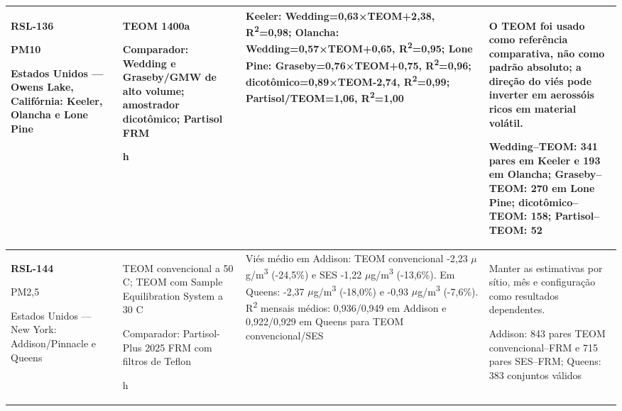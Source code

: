 \begin{longtable}{|P{0.18\textwidth}|P{0.25\textwidth}|P{0.28\textwidth}|P{\arrayrulewidth\relax}|}
\textbf{RSL-136}\par\textcite{rsl136}\par PM10\par Estados Unidos --- Owens Lake, Califórnia: Keeler, Olancha e Lone Pine & TEOM 1400a\par\medskip Comparador: Wedding e Graseby/GMW de alto volume; amostrador dicotômico; Partisol FRM\par{} h & Keeler: Wedding=0,63×TEOM+2,38, R\textsuperscript{2}=0,98; Olancha: Wedding=0,57×TEOM+0,65, R\textsuperscript{2}=0,95; Lone Pine: Graseby=0,76×TEOM+0,75, R\textsuperscript{2}=0,96; dicotômico=0,89×TEOM-2,74, R\textsuperscript{2}=0,99; Partisol/TEOM=1,06, R\textsuperscript{2}=1,00 & O TEOM foi usado como referência comparativa, não como padrão absoluto; a direção do viés pode inverter em aerossóis ricos em material volátil.\par\medskip Wedding--TEOM: 341 pares em Keeler e 193 em Olancha; Graseby--TEOM: 270 em Lone Pine; dicotômico--TEOM: 158; Partisol--TEOM: 52\\\hline
\textbf{RSL-144}\par\textcite{rsl144}\par PM2,5\par Estados Unidos --- New York: Addison/Pinnacle e Queens & TEOM convencional a 50 \textdegree{}C; TEOM com Sample Equilibration System a 30 \textdegree{}C\par\medskip Comparador: Partisol-Plus 2025 FRM com filtros de Teflon\par{} h & Viés médio em Addison: TEOM convencional -2,23 \ensuremath{\mu}g/m\textsuperscript{3} (-24,5\%) e SES -1,22 \ensuremath{\mu}g/m\textsuperscript{3} (-13,6\%). Em Queens: -2,37 \ensuremath{\mu}g/m\textsuperscript{3} (-18,0\%) e -0,93 \ensuremath{\mu}g/m\textsuperscript{3} (-7,6\%). R\textsuperscript{2} mensais médios: 0,936/0,949 em Addison e 0,922/0,929 em Queens para TEOM convencional/SES & Manter as estimativas por sítio, mês e configuração como resultados dependentes.\par\medskip Addison: 843 pares TEOM convencional--FRM e 715 pares SES--FRM; Queens: 383 conjuntos válidos\\\hline

\end{longtable}
